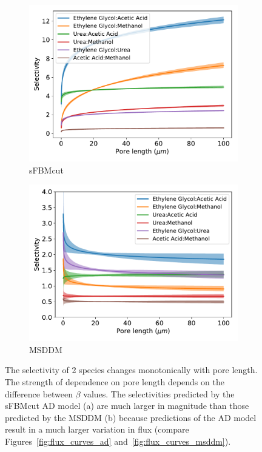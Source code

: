 \documentclass[12pt]{article}
\begin{document}
  \begin{figure}
  \centering
  \begin{subfigure}{0.45\textwidth}
  \includegraphics[width=\textwidth]{selectivity.pdf}
  \caption{sFBMcut}
  \end{subfigure}
  \begin{subfigure}{0.45\textwidth}
  \includegraphics[width=\textwidth]{selectivity_msddm.pdf}
  \caption{MSDDM}
  \end{subfigure}
  \caption{The selectivity of 2 species changes monotonically with pore length. The
  strength of dependence on pore length depends on the difference between $\beta$ values.
  The selectivities predicted by the sFBMcut AD model (a) are much larger in magnitude than
  those predicted by the MSDDM (b) because predictions of the AD model result in a much
  larger variation in flux (compare Figures~\ref{fig:flux_curves_ad} and~\ref{fig:flux_curves_msddm}).}
  \label{fig:selectivity}
  \end{figure}
  
\end{document}
